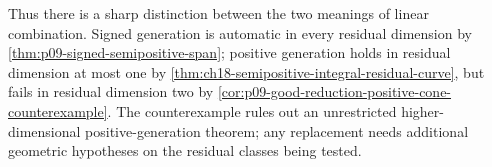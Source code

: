 




Thus there is a sharp distinction between the two meanings of linear
combination.  Signed generation is automatic in every residual dimension
by \cref{thm:p09-signed-semipositive-span}; positive generation holds in
residual dimension at most one by
\cref{thm:ch18-semipositive-integral-residual-curve}, but fails in residual
dimension two by
\cref{cor:p09-good-reduction-positive-cone-counterexample}.  The
counterexample rules out an unrestricted higher-dimensional
positive-generation theorem; any replacement needs additional geometric
hypotheses on the residual classes being tested.

